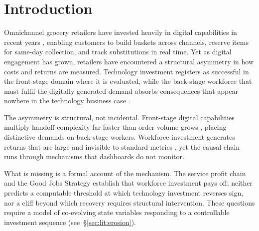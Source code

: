 \documentclass[msom,dblanonrev]{informs4}
\begin{document}


\maketitle

\section{Introduction}\label{sec:intro}

Omnichannel grocery retailers have invested heavily in digital capabilities in recent years \citep{hubner2021digitalization, bijmolt2021challenges}, enabling customers to build baskets across channels, reserve items for same-day collection, and track substitutions in real time. Yet as digital engagement has grown, retailers have encountered a structural asymmetry in how costs and returns are measured. Technology investment registers as successful in the front-stage domain where it is evaluated, while the back-stage workforce that must fulfil the digitally generated demand absorbs consequences that appear nowhere in the technology business case \citep{corbett2024wellbeing}.

The asymmetry is structural, not incidental. Front-stage digital capabilities multiply handoff complexity far faster than order volume grows \citep{saghiri2017toward}, placing distinctive demands on back-stage workers. Workforce investment generates returns that are large and invisible to standard metrics \citep{fisher2021staffing, kesavan2022doing, ton2014good}, yet the causal chain runs through mechanisms that dashboards do not monitor.

What is missing is a formal account of the mechanism. The service profit chain \citep{heskett1994putting} and the Good Jobs Strategy \citep{ton2014good} establish that workforce investment pays off; neither predicts a computable threshold at which technology investment reverses sign, nor a cliff beyond which recovery requires structural intervention. These questions require a model of co-evolving state variables responding to a controllable investment sequence (see~\S\ref{sec:lit:erosion}).
\end{document}

